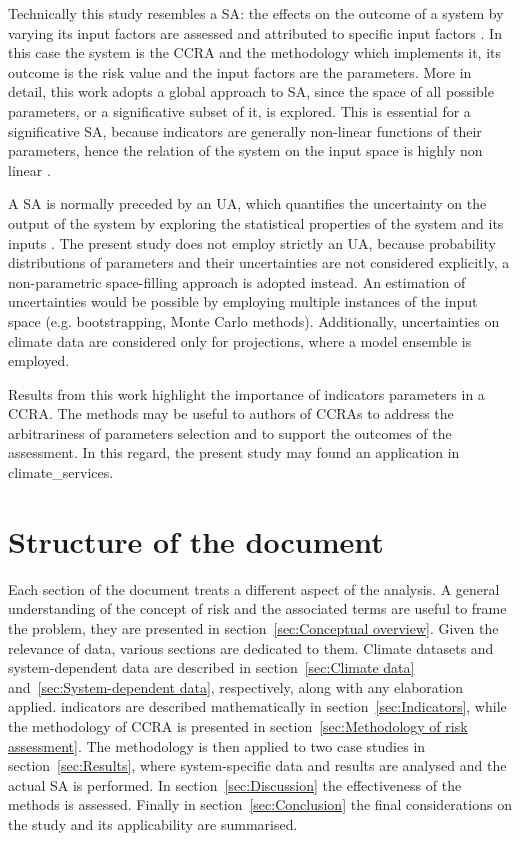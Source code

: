Technically this study resembles a \gls{SA}: the effects on the outcome of a system by varying its input factors are assessed and attributed to specific input factors \cite[627-632]{2015DeanHandbookOf}. In this case the system is the \gls{CCRA} and the methodology which implements it, its outcome is the \gls{risk} value and the input factors are the parameters.
More in detail, this work adopts a global approach to \gls{SA}, since the space of all possible parameters, or a significative subset of it, is explored. This is essential for a significative \gls{SA}, because \glspl{indicator} are generally non-linear functions of their parameters, hence the relation of the system on the input space is highly non linear \cite[31-32]{2019SaltelliWhySo}.

A \gls{SA} is normally preceded by an \gls{UA}, which quantifies the uncertainty on the output of the system by exploring the statistical properties of the system and its inputs \cite[29-30]{2019SaltelliWhySo}. The present study does not employ strictly an \gls{UA}, because probability distributions of parameters and their uncertainties are not considered explicitly, a non-parametric space-filling approach is adopted instead.
An estimation of uncertainties would be possible by employing multiple instances of the input space (e.g. bootstrapping, Monte Carlo methods). Additionally, uncertainties on climate data are considered only for projections, where a model ensemble is employed.

Results from this work highlight the importance of \glspl{indicator} parameters in a \gls{CCRA}. The methods may be useful to authors of \glspl{CCRA} to address the arbitrariness of parameters selection and to support the outcomes of the assessment. In this regard, the present study may found an application in \glspl{climate_service}.



\section{Structure of the document}
Each section of the document treats a different aspect of the analysis.
A general understanding of the concept of \gls{risk} and the associated terms are useful to frame the problem, they are presented in section~\ref{sec:Conceptual overview}.
Given the relevance of data, various sections are dedicated to them. Climate datasets and system-dependent data are described in section~\ref{sec:Climate data} and~\ref{sec:System-dependent data}, respectively, along with any elaboration applied. \Glspl{indicator} are described mathematically in section~\ref{sec:Indicators}, while the methodology of \gls{CCRA} is presented in section~\ref{sec:Methodology of risk assessment}.
The methodology is then applied to two case studies in section~\ref{sec:Results}, where system-specific data and results are analysed and the actual \gls{SA} is performed.
In section~\ref{sec:Discussion} the effectiveness of the methods is assessed.
Finally in section~\ref{sec:Conclusion} the final considerations on the study and its applicability are summarised.
